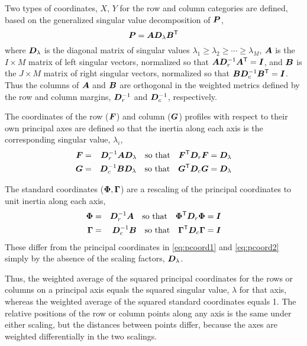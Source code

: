 Two types of coordinates, $X$, $Y$ for the row and column categories are defined,
based on the generalized singular value decomposition of $\bm{P}$,
\begin{equation*}%
\mat{P} = \mat{A} \mat{D}_{\lambda} \mat{B}\trans
\end{equation*}
where $\bm{D}_{\lambda}$ is the diagonal matrix of singular values
\(\lambda_1 \geq \lambda_2 \geq \cdots \geq \lambda_M\),
$\bm{A}$ is the $I \times M$ matrix of left singular vectors,
normalized so that
\( \bm{A} \bm{D}_r^{-1} \bm{A}^\mathsf{T} = \bm{I} \), and
$\bm{B}$ is the $J \times M$ matrix of right singular vectors,
normalized so that
\( \bm{B} \bm{D}_c^{-1} \bm{B}^\mathsf{T} = \bm{I} \).
Thus the columns of $\bm{A}$ and $\bm{B}$ are orthogonal in the weighted metrics
defined by the row and column margins, $\bm{D}_r^{-1}$ and $\bm{D}_c^{-1}$,
respectively.
\begin{description}
\item[principal coordinates]  The coordinates of the row ($\bm{F}$) and column ($\bm{G}$) profiles
with respect to their own principal axes are defined so that the inertia along
each axis is the corresponding singular value, $\lambda_i$,
\begin{eqnarray}
%
\mat{F} & = & \mat{D}_r^{-1} \mat{A} \mat{D}_{\lambda} \quad\mbox{so that} \quad \mat{F}\trans \mat{D}_r \mat{F} = \mat{D}_{\lambda} \label{eq:pcoord1} \\
\mat{G} & = & \mat{D}_c^{-1} \mat{B} \mat{D}_{\lambda} \quad\mbox{so that} \quad \mat{G}\trans \mat{D}_c \mat{G} = \mat{D}_{\lambda} \label{eq:pcoord2}
\end{eqnarray}
\item[standard coordinates] The standard coordinates ($\bm{\Phi}, \bm{\Gamma}$) are a rescaling of the principal
coordinates to unit inertia along each axis,
\begin{eqnarray}
\bm{\Phi} & = & \bm{D}_r^{-1} \bm{A}  \quad\mbox{so that} \quad \bm{\Phi}^\mathsf{T} \bm{D}_r \bm{\Phi} = \bm{I} \\
\bm{\Gamma} & = & \bm{D}_c^{-1} \bm{B} \quad\mbox{so that} \quad \bm{\Gamma}^\mathsf{T} \bm{D}_c \bm{\Gamma} = \bm{I}
\end{eqnarray}
These differ from the principal coordinates in \eqref{eq:pcoord1}
and \eqref{eq:pcoord2} simply by the absence of the scaling factors,
$\bm{D}_{\lambda}$.
\end{description}
Thus, the weighted average of the squared principal coordinates
for the rows or columns on a principal axis equals the squared
singular value, $\lambda$ for that axis,
whereas the weighted average of the squared standard coordinates
equals 1.
The relative positions of the row or column points along any axis
is the same under either scaling,
but the distances between points differ, because the axes are
weighted differentially in the two scalings.


